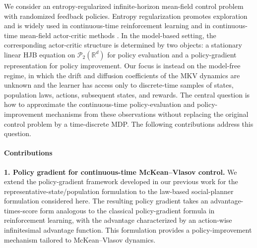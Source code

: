 \documentclass[a4paper, 10pt, english, reqno]{amsart}
\begin{document}
We consider an entropy-regularized infinite-horizon mean-field control problem with randomized feedback policies. Entropy regularization promotes exploration and is widely used in continuous-time reinforcement learning \cite{wang2020,jia2022,jia2023} and in continuous-time mean-field actor-critic methods \cite{frikhaActorCritic,Wei2023ContinuousTQ}. In the model-based setting, the corresponding actor-critic structure is determined by two objects: a stationary linear HJB equation on $\mathcal P_2(\mathbb R^d)$ for policy evaluation and a policy-gradient representation for policy improvement. Our focus is instead on the model-free regime, in which the drift and diffusion coefficients of the MKV dynamics are unknown and the learner has access only to discrete-time samples of states, population laws, actions, subsequent states, and rewards. The central question is how to approximate the continuous-time policy-evaluation and policy-improvement mechanisms from these observations without replacing the original control problem by a time-discrete MDP. The following contributions address this question.
\smallbreak


\paragraph{Contributions}


\noindent


\textbf{1. Policy gradient for continuous-time McKean--Vlasov control.} We extend the policy-gradient framework developed in our previous work for the representative-state/population formulation \cite{firstpaper} to the law-based social-planner formulation considered here. The resulting policy gradient takes an advantage-times-score form analogous to the classical policy-gradient formula in reinforcement learning, with the advantage characterized by an action-wise infinitesimal advantage function. This formulation provides a policy-improvement mechanism tailored to McKean--Vlasov dynamics.
\smallbreak
\end{document}
